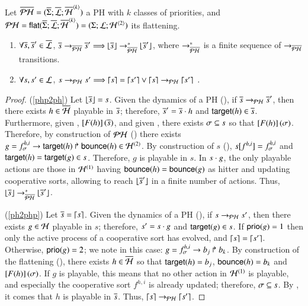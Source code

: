 \begin{theorem}
\label{thm:bisimPHP}
  Let $\ov{\PH} = (\ov{\PHs}; \ov{\PHl}; \ov{\PHa}^{\angles{k}})$ a PH with $k$ classes of priorities,
  and $\PH = \PHflat(\ov{\PHs}; \ov{\PHl}; \ov{\PHa}^{\angles{k}}) = (\PHs; \PHl; \PHa^{\angles{2}})$ its flattening.
  \begin{enumerate}
    \item \label{php2ph} $\forall \os, \os' \in \ov{\PHl}$,
      $\os \PHPtrans[\oPH] \os' \Longrightarrow \flats{\os} \PHPtrans[\oPH]^* \flats{\os'}$,
      where $\PHPtrans[\oPH]^*$ is a finite sequence of $\PHPtrans[\oPH]$ transitions.
    \item \label{ph2php} $\forall s, s' \in \PHl$,
      $s \PHPtrans s' \Longrightarrow \unflats{s} = \unflats{s'} \vee
      \unflats{s} \PHPtrans \unflats{s'} \enspace.$
  \end{enumerate}
\end{theorem}
%
\begin{proof}
  (\ref{php2ph}) Let $\flats{\os} = s$.
    Given the dynamics of a PH (), if $\os \PHPtrans[\PH] \os'$,
    then there exists $h \in \ov{\PHh}$ playable in $\os$;
    therefore, $\os' = \os \PHplay h$ and $\target{h} \in \os$.
    Furthermore, given , $\Fsem{\F(h)}{\os}$,
    and given , there exists $\mysigma \subseteq s$ so that $\Fsem{\F(h)}{\mysigma}$.
    Therefore, by construction of $\PH$ () there exists
    $g = \PHhit{f^{h,i}_\mysigma}{\target{h}}{\bounce{h}} \in \PHh^{(2)}$.
    By construction of $s$ (), $\PHget{s}{f^{h,i}} = f^{h,i}_\mysigma$ and $\target{h} = \target{g} \in s$.
    Therefore, $g$ is playable in $s$.
    In $s \PHplay g$, the only playable actions are those in $\PHh^{(1)}$ having $\bounce{h} = \bounce{g}$ as hitter
    and updating cooperative sorts, allowing to reach $\flats{\os'}$ in a finite number of actions.
    Thus, $\flats{\os} \PHPtrans[\oPH]^* \flats{\os'}$.
  
  (\ref{ph2php}) Let $\os = \unflats{s}$.
    Given the dynamics of a PH (), if $s \PHPtrans s'$,
    then there exists $g \in \PHh$ playable in $s$; therefore, $s' = s \PHplay g$ and $\target{g} \in s$.
    If $\prio(g) = 1$ then only the active process of a cooperative sort has evolved, and $\unflats{s} = \unflats{s'}$.
    Otherwise, $\prio(g) = 2$; we note in this case: $g = \PHhit{f^{h,i}_\mysigma}{b_j}{b_k}$.
    By construction of the flattening (), there exists $h \in \ov{\PHh}$ so that
    $\target{h} = b_j$, $\bounce{h} = b_k$ and $\Fsem{\F(h)}{\mysigma}$.
    If $g$ is playable, this means that no other action in $\PHh^{(1)}$ is playable, and especially the cooperative sort
    $f^{h,i}$ is already updated; therefore, $\mysigma \subseteq s$.
    By , it comes that $h$ is playable in $\os$.
    Thus, $\unflats{s} \PHPtrans \unflats{s'}$.
\end{proof}
